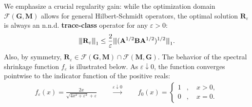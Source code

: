 \documentclass[noinfoline]{imsart}\setcounter{tocdepth}{2}
\newcommand{\m}[1]{\mathbf{#1}}
\renewcommand{\c}[1]{\mathcal{#1}}
\newcommand{\vertii}[1]{{\vert\kern-0.25ex\vert\kern-0.25ex\vert #1 
    \vert\kern-0.25ex\vert\kern-0.25ex\vert}} %
\theoremstyle{plain}
\begin{document}
We emphasize a crucial regularity gain: while the optimization domain $\c{F}(\m{G}, \m{M})$ allows for general Hilbert-Schmidt operators, the optimal solution $\m{R}_{\varepsilon}$ is always an  n.n.d. \textbf{trace-class} operator for any $\varepsilon > 0$:
\begin{align*}
    \vertii{\m{R}_{\varepsilon}}_1 \le \frac{2}{\varepsilon} \vertii{(\m{A}^{1/2} \m{B} \m{A}^{1/2})^{1/2}}_1.
\end{align*}
Also, by symmetry, $\m{R}_{\varepsilon} \in \c{F}(\m{G}, \m{M}) \cap \c{F}(\m{M}, \m{G})$.
The behavior of the spectral shrinkage function $f_{\varepsilon}$ is illustrated below. As $\varepsilon \downarrow 0$, the function converges pointwise to the indicator function of the positive reals:
\begin{align*}
    f_{\varepsilon}(x) = \frac{2x}{\sqrt{4x^{2}+\varepsilon^{2}}+\varepsilon} \qquad \stackrel{\varepsilon \downarrow 0}{\longrightarrow} \qquad
    f_{0}(x) = \begin{cases}
        1 &, \quad x > 0, \\
        0 &, \quad x=0.
    \end{cases}
\end{align*}
\end{document}
